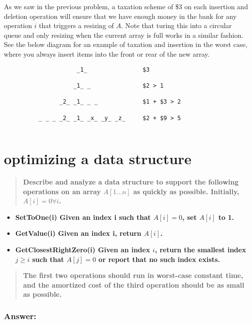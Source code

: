 \documentclass[titlepage]{article}\usepackage[]{graphicx}\usepackage[]{color}
\begin{document}
As we saw in the previous problem, a taxation scheme of \$3 on each insertion
and deletion operation will ensure that we have enough money in the bank for
any operation $i$ that triggers a resizing of $A$. Note that turing this into a
circular queue and only resizing when the current array is full works in a
similar fashion. See the below diagram for an example of taxation and insertion
in the worst case, where you always insert items into the front or rear of the
new array.

\begin{verbatim}
                     _1_                $3  

                    _1_ _               $2 > 1

                _2_ _1_ _ _             $1 + $3 > 2

          _ _ _ _2_ _1_ _x_ _y_ _z_     $2 + $9 > 5
            
\end{verbatim}

\section{optimizing a data structure}
\begin{quote}
  \textbf{Describe and analyze a data structure to support the following
	operations on an array $A[1\dots n]$ as quickly as possible. Initially, $A[i]
  = 0 \forall i$.}
\end{quote}

\begin{itemize}
  \item \textbf{SetToOne(i) Given an index i such that $A[i] = 0$, set $A[i]$ to 1.}
  \item \textbf{GetValue(i) Given an index i, return $A[i]$. }
  \item \textbf{GetClosestRightZero(i) Given an index $i$, return the smallest
	index $j \geq i$ such that $A[j] = 0$ or report that no such index exists.}
\end{itemize}
\begin{quote}
  \textbf{The first two operations should run in worst-case constant time, and
  the amortized cost of the third operation should be as small as possible.}
\end{quote}

\subsubsection{Answer: }
\end{document}

